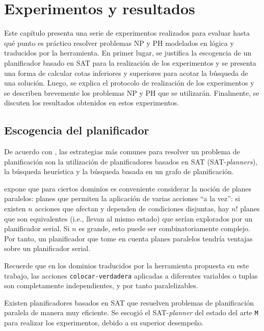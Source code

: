 \chapter{Experimentos y resultados}
\label{Chapter4}

Este capítulo presenta una serie de experimentos realizados para evaluar hasta
qué punto es práctico resolver problemas NP y PH modelados en lógica y
traducidos por la herramienta.
En primer lugar, se justifica la escogencia de un planificador basado en SAT
para la realización de los experimentos y se presenta una forma de calcular
cotas inferiores y superiores para acotar la búsqueda de una solución. Luego,
se explica el protocolo de realización de los experimentos y se describen brevemente 
los problemas NP y PH que se utilizarán. Finalmente, se discuten los resultados
obtenidos en estos experimentos.

\section{Escogencia del planificador}
De acuerdo con \cite{russell:book}, las estrategias más comunes para resolver
un problema de planificación son la utilización de planificadores basados en
SAT (SAT-\textit{planners}), la búsqueda heurística y la búsqueda basada en un
grafo de planificación.

\cite{rintanen:notes} expone que para ciertos dominios es conveniente
considerar la noción de planes paralelos: planes que permiten la aplicación de
varias acciones ``a la vez'': si existen $n$ acciones que afectan y dependen de
condiciones disjuntas, hay $n!$ planes que son equivalentes (i.e., llevan al
mismo estado) que serían explorados por un planificador serial. Si $n$ es
grande, esto puede ser combinatoriamente complejo. Por tanto, un planificador
que tome en cuenta planes paralelos tendría ventajas sobre un planificador
serial.

Recuerde que en los dominios traducidos por la herramienta propuesta en este
trabajo, las acciones \texttt{colocar-verdadera}
aplicadas a diferentes variables o tuplas son completamente independientes, y
por tanto paralelizables.

Existen planificadores basados en SAT que resuelven problemas de
planificación paralela de manera muy eficiente. Se escogió el
SAT-\textit{planner} del
estado del arte \texttt{M} \citep{rintanen:m2010} para realizar los experimentos, 
debido a su superior desempeño.

